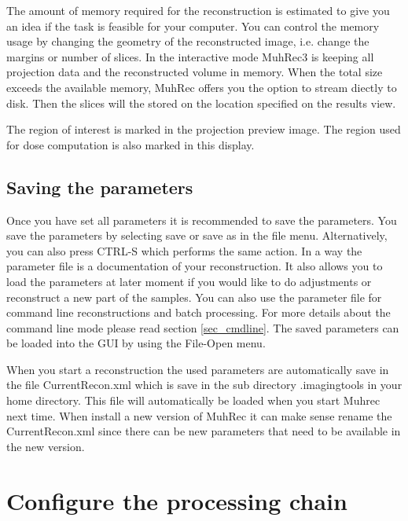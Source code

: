 \documentclass[a4paper]{scrreprt}
\begin{document}
The amount of memory required for the reconstruction is estimated to give you an idea if the task is feasible for your computer. You can control the memory usage by changing the geometry of the reconstructed image, i.e. change the margins or number of slices. In the interactive mode MuhRec3 is keeping all projection data and the reconstructed volume in memory. When the total size exceeds the available memory, MuhRec offers you the option to stream diectly to disk. Then the slices will the stored on the location specified on the results view.

The region of interest is marked in the projection preview image. The region used for dose computation is also marked in this display.

\subsection{Saving the parameters}
Once you have set all parameters it is recommended to save the parameters. You save the parameters by selecting save or save as in the file menu. Alternatively, you can also press CTRL-S which performs the same action. In a way the parameter file is a documentation of your reconstruction. It also allows you to load the parameters at later moment if you would like to do adjustments or reconstruct a new part of the samples. You can also use the parameter file for command line reconstructions and batch processing. For more details about the command line mode please read section \ref{sec_cmdline}. The saved parameters can be loaded into the GUI by using the File-Open menu.

When you start a reconstruction the used parameters are automatically save in the file CurrentRecon.xml which is save in the sub directory .imagingtools in your home directory. This file will automatically be loaded when you start Muhrec next time. When install a new version of MuhRec it can make sense rename the CurrentRecon.xml since there can be new parameters that need to be available in the new version.

\section{Configure the processing chain}
\end{document}
